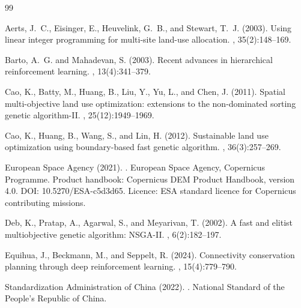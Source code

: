 \documentclass[preprint,12pt]{elsarticle}
\begin{document}
\begin{thebibliography}{99}

Aerts, J.~C., Eisinger, E., Heuvelink, G.~B., and Stewart, T.~J. (2003).
\newblock Using linear integer programming for multi-site land-use allocation.
, 35(2):148--169.

Barto, A.~G. and Mahadevan, S. (2003).
\newblock Recent advances in hierarchical reinforcement learning.
, 13(4):341--379.

Cao, K., Batty, M., Huang, B., Liu, Y., Yu, L., and Chen, J. (2011).
\newblock Spatial multi-objective land use optimization: extensions to the non-dominated sorting genetic algorithm-{II}.
, 25(12):1949--1969.

Cao, K., Huang, B., Wang, S., and Lin, H. (2012).
\newblock Sustainable land use optimization using boundary-based fast genetic algorithm.
, 36(3):257--269.

European Space Agency (2021).
.
\newblock European Space Agency, Copernicus Programme. Product handbook: Copernicus DEM Product Handbook, version 4.0. DOI: 10.5270/ESA-c5d3d65. Licence: ESA standard licence for Copernicus contributing missions.

Deb, K., Pratap, A., Agarwal, S., and Meyarivan, T. (2002).
\newblock A fast and elitist multiobjective genetic algorithm: {NSGA-II}.
, 6(2):182--197.

Equihua, J., Beckmann, M., and Seppelt, R. (2024).
\newblock Connectivity conservation planning through deep reinforcement learning.
, 15(4):779--790.

Standardization Administration of China (2022).
.
\newblock National Standard of the People's Republic of China.


\end{thebibliography}
\end{document}
